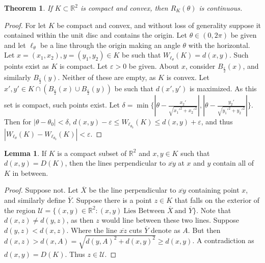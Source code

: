 \documentclass[oneside]{book}
\newtheorem{theorem}{Theorem}[section]
\theoremstyle{definition}
\newtheorem{lemma}{Lemma}[section]
\begin{document}
\begin{figure}[!h]
  \centering
  \hfill
  \hfill
\end{figure}

\begin{theorem}
If $K\subset \mathbb{R}^2$ is compact and convex, then $R_K(\theta)$ is continuous.
\end{theorem}
\begin{proof}
For let $K$ be compact and convex, and without loss of generality suppose it contained within the unit disc and contains the origin. Let $\theta\in (0,2\pi)$ be given and let $\ell_{\theta}$ be a line through the origin making an angle $\theta$ with the horizontal. Let $x=(x_1,x_2),y=(y_1,y_2)\in K$ be such that $W_{\ell_{\theta}}(K) = d(x,y)$. Such points exist as $K$ is compact. Let $\varepsilon>0$ be given. About $x$, consider $B_{\frac{\varepsilon}{2}}(x)$, and similarly $B_{\frac{\varepsilon}{2}}(y)$. Neither of these are empty, as $K$ is convex. Let $x',y'\in K\cap(B_{\frac{\varepsilon}{2}}(x)\cup B_{\frac{\varepsilon}{2}}(y))$ be such that $d(x',y')$ is maximized. As this set is compact, such points exist. Let $\delta = \min\{|\theta-\frac{x_2'}{\sqrt{x_1'^2+x_2'^2}}|,|\theta-\frac{y_2'}{\sqrt{y_1'^2+y_2'^2}}|\}$. Then for $|\theta-\theta_0|<\delta$, $d(x,y)-\varepsilon \leq W_{\ell_{\theta_0}}(K)\leq d(x,y)+\varepsilon$, and thus $|W_{\ell_\theta}(K)-W_{\ell_{\theta_0}}(K)| < \varepsilon$.
\end{proof}

\begin{lemma}
If $K$ is a compact subset of $\mathbb{R}^2$ and $x,y\in K$ such that $d(x,y)=D(K)$, then the lines perpendicular to $\overline{xy}$ at $x$ and $y$ contain all of $K$ in between.
\end{lemma}
\begin{proof}
Suppose not. Let $\overline{X}$ be the line perpendicular to $\overline{xy}$ containing point $x$, and similarly define $\overline{Y}$. Suppose there is a point $z\in K$ that falls on the exterior of the region $\mathcal{U} = \{(x,y)\in \mathbb{R}^2: (x,y)\ \textrm{Lies Between } \overline{X}\ \textrm{and } \overline{Y}\}$. Note that $d(x,z)\ne d(y,z)$, as then $z$ would line between these two lines. Suppose $d(y,z)<d(x,z)$. Where the line $\overline{xz}$ cuts $\overline{Y}$ denote as $A$. But then $d(x,z) > d(x,A) = \sqrt{d(y,A)^2+d(x,y)^2}\geq d(x,y)$. A contradiction as $d(x,y) = D(K)$. Thus $z\in \mathcal{U}$.
\end{proof}
\end{document}
